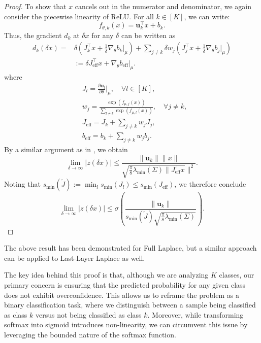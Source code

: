 \documentclass{article}
\begin{document}
\begin{proof}
To show that \( x \) cancels out in the numerator and denominator, we again consider the piecewise linearity of ReLU. For all \( k \in [K] \), we can write:
\begin{equation}
    f_{\theta,k}(x) = \mathbf{u}_{k}^{\intercal}x + b_{k}.
\end{equation}
Thus, the gradient \( d_k \) at \( \delta x \) for any \( \delta \) can be written as
\begin{align*}
    d_{k}(\delta x) =
    &\delta (J_{k}^{\intercal}x + \frac{1}{\delta}\nabla_{\theta} b_{k}|_{\mu}) 
    + \sum_{j\neq k}\delta w_{j}(J_{j}^{\intercal}x + \frac{1}{\delta}\nabla_{\theta}b_{j}|_{\mu})\\
    & := \delta J_{\text{eff}}^{\intercal}x + \nabla_{\theta} b_{\text{eff}}|_{\mu}.
\end{align*}
where
\begin{align*}
    & J_l = \frac{\partial \mathbf{u}_{l}}{\partial \theta}|_{\mu}, \quad \forall l \in [K],\\
    & w_j = \frac{\exp(f_{\mu,j}(x))}{\sum_{l\neq k}\exp(f_{\mu, l}(x))}, \quad \forall j \neq k, \\
    & J_{\text{eff}} = J_{k} + \sum_{j \neq k}w_j J_j, \\
    & b_{\text{eff}} = b_{k} + \sum_{j \neq k}w_j b_{j}.
\end{align*}
By a similar argument as in \cite{main_paper}, we obtain
\begin{equation*}
    \lim_{\delta\to \infty} \lvert z(\delta x)\rvert \leq \frac{\lVert\mathbf{u}_k\rVert \lVert x\rVert}
    {\sqrt{\frac{\pi}{8}\lambda_{\min}(\Sigma) \lVert J_{\text{eff}}^{\intercal}x}\rVert^{2}}.
\end{equation*}
Noting that \( s_{\min}(\tilde{J}) := \min_{l} s_{\min}(J_{l}) \leq s_{\min}(J_{\text{eff}}) \), we therefore conclude
\begin{equation*}
    \lim_{\delta\to \infty} \lvert z(\delta x)\rvert \leq 
    \sigma \left(\frac{\lVert\mathbf{u}_k\rVert}{s_{\min}(\tilde{J})\sqrt{\frac{\pi}{8}\lambda_{\min}(\Sigma)}}\right).
\end{equation*}
\end{proof}

The above result has been demonstrated for Full Laplace, but a similar approach can be applied to Last-Layer Laplace as well.

The key idea behind this proof is that, although we are analyzing \(K\) classes, our primary concern is ensuring that the predicted probability for any given class does not exhibit overconfidence. This allows us to reframe the problem as a binary classification task, where we distinguish between a sample being classified as class \(k\) versus not being classified as class \(k\). Moreover, while transforming softmax into sigmoid introduces non-linearity, we can circumvent this issue by leveraging the bounded nature of the softmax function.
\end{document}
